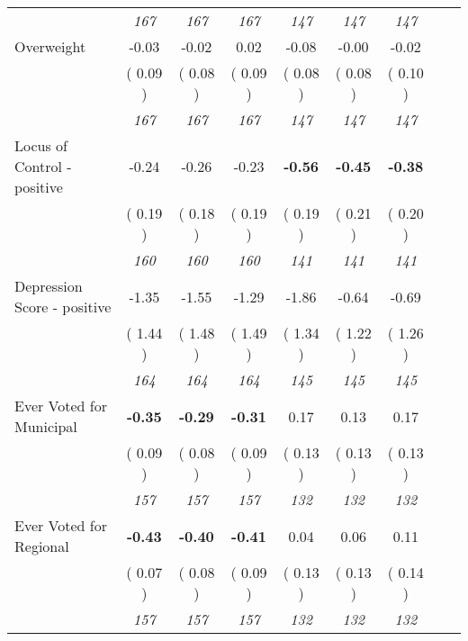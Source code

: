 \begin{tabular}{l c c c c c c c c}
& \textit{ 167 } & \textit{ 167 } & \textit{ 167 } & \textit{ 147 } & \textit{ 147 } & \textit{ 147 } \\
Overweight &     -0.03 &     -0.02 &      0.02 &     -0.08 &     -0.00 &     -0.02 \\
& (     0.09 ) & (     0.08 ) & (     0.09 ) & (     0.08 ) & (     0.08 ) & (     0.10 ) \\
& \textit{ 167 } & \textit{ 167 } & \textit{ 167 } & \textit{ 147 } & \textit{ 147 } & \textit{ 147 } \\
Locus of Control - positive &     -0.24 &     -0.26 &     -0.23 & \textbf{     -0.56 } & \textbf{     -0.45 } & \textbf{     -0.38 } \\
& (     0.19 ) & (     0.18 ) & (     0.19 ) & (     0.19 ) & (     0.21 ) & (     0.20 ) \\
& \textit{ 160 } & \textit{ 160 } & \textit{ 160 } & \textit{ 141 } & \textit{ 141 } & \textit{ 141 } \\
Depression Score - positive &     -1.35 &     -1.55 &     -1.29 &     -1.86 &     -0.64 &     -0.69 \\
& (     1.44 ) & (     1.48 ) & (     1.49 ) & (     1.34 ) & (     1.22 ) & (     1.26 ) \\
& \textit{ 164 } & \textit{ 164 } & \textit{ 164 } & \textit{ 145 } & \textit{ 145 } & \textit{ 145 } \\
Ever Voted for Municipal & \textbf{     -0.35 } & \textbf{     -0.29 } & \textbf{     -0.31 } &      0.17 &      0.13 &      0.17 \\
& (     0.09 ) & (     0.08 ) & (     0.09 ) & (     0.13 ) & (     0.13 ) & (     0.13 ) \\
& \textit{ 157 } & \textit{ 157 } & \textit{ 157 } & \textit{ 132 } & \textit{ 132 } & \textit{ 132 } \\
Ever Voted for Regional & \textbf{     -0.43 } & \textbf{     -0.40 } & \textbf{     -0.41 } &      0.04 &      0.06 &      0.11 \\
& (     0.07 ) & (     0.08 ) & (     0.09 ) & (     0.13 ) & (     0.13 ) & (     0.14 ) \\
& \textit{ 157 } & \textit{ 157 } & \textit{ 157 } & \textit{ 132 } & \textit{ 132 } & \textit{ 132 } \\
\bottomrule
\end{tabular}
